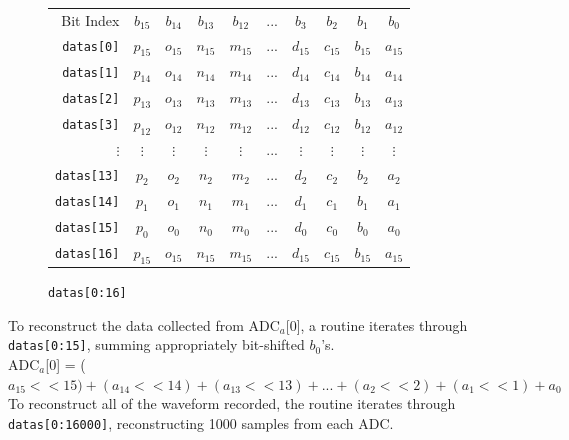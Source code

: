 \documentclass[11pt,twoside]{mitthesis}
\begin{document}
\begin{figure}[h]
\begin{center}
\begin{tabular}{ r|c c c c c c c c c | }
\multicolumn{1}{r}{Bit Index}
 &  \multicolumn{1}{c}{$b_{15}$}
 &  \multicolumn{1}{c}{$b_{14}$}
 &  \multicolumn{1}{c}{$b_{13}$}
 &  \multicolumn{1}{c}{$b_{12}$}
 &  \multicolumn{1}{c}{$...$}
 &  \multicolumn{1}{c}{$b_{3}$}
 &  \multicolumn{1}{c}{$b_{2}$}
 &  \multicolumn{1}{c}{$b_{1}$}
 &  \multicolumn{1}{c}{$b_{0}$}\\
\cline{2-10}
\texttt{datas[0]} 
 & $p_{15}$ & $o_{15}$ & $n_{15}$ & $m_{15}$ & ... & $d_{15}$ & $c_{15}$ & $b_{15}$ & $a_{15}$
  \\ \cline{2-10} \cline{2-10}
 \texttt{datas[1]} 
 & $p_{14}$ & $o_{14}$ & $n_{14}$ & $m_{14}$ & ... & $d_{14}$ & $c_{14}$ & $b_{14}$ & $a_{14}$
  \\  \cline{2-10} 
 \texttt{datas[2]} 
 & $p_{13}$ & $o_{13}$ & $n_{13}$ & $m_{13}$ & ... & $d_{13}$ & $c_{13}$ & $b_{13}$ & $a_{13}$
  \\  \cline{2-10} 
 \texttt{datas[3]} 
 & $p_{12}$ & $o_{12}$ & $n_{12}$ & $m_{12}$ & ... & $d_{12}$ & $c_{12}$ & $b_{12}$ & $a_{12}$
  \\  \cline{2-10} 
$\vdots$\hspace{2em}
 & $\vdots$ & $\vdots$ & $\vdots$ & $\vdots$ & ... & $\vdots$ & $\vdots$ & $\vdots$ & $\vdots$
  \\  \cline{2-10} 
 \texttt{datas[13]}
 & $p_{2}$ & $o_{2}$ & $n_{2}$ & $m_{2}$ & ... & $d_{2}$ & $c_{2}$ & $b_{2}$ & $a_{2}$
  \\  \cline{2-10} 
 \texttt{datas[14]}
 & $p_{1}$ & $o_{1}$ & $n_{1}$ & $m_{1}$ & ... & $d_{1}$ & $c_{1}$ & $b_{1}$ & $a_{1}$
  \\  \cline{2-10} 
 \texttt{datas[15]}
 & $p_{0}$ & $o_{0}$ & $n_{0}$ & $m_{0}$ & ... & $d_{0}$ & $c_{0}$ & $b_{0}$ & $a_{0}$
  \\  \cline{2-10} 
 \texttt{datas[16]}
 & $p_{15}$ & $o_{15}$ & $n_{15}$ & $m_{15}$ & ... & $d_{15}$ & $c_{15}$ & $b_{15}$ & $a_{15}$
  \\  \cline{2-10} 
  
\end{tabular}
\end{center}
\caption{\texttt{datas[0:16]}}
\label{fig:data-reconstruct}
\end{figure}

To reconstruct the data collected from ADC$_a$[0], a routine iterates through \texttt{datas[0:15]}, summing appropriately bit-shifted $b_0$'s.\\
ADC$_a$[0] = ($a_{15}<<15)+(a_{14}<<14)+(a_{13}<<13)+...+(a_{2}<<2)+(a_{1}<<1)+a_0$\\
To reconstruct all of the waveform recorded, the routine iterates through \texttt{datas[0:16000]}, reconstructing 1000 samples from each ADC.
\end{document}
